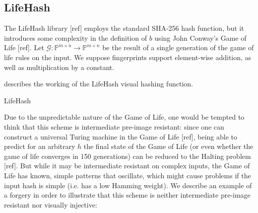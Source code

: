 \documentclass{article}
\newcommand{\bb}{\mathbb}
\newcommand{\prgb}{\bb P _\mathsf{RGB}}
\begin{document}
\subsection{LifeHash}
The LifeHash library [ref] employs the standard SHA-256 hash function, but it introduces some complexity in the definition of $b$ using John Conway's Game of Life [ref]. Let $\mathcal{G} : \mathbb P^{m \times n} \rightarrow \mathbb P ^{m \times n}$ be the result of a single generation of the game of life rules on the input. We suppose fingerprints support element-wise addition, as well as multiplication by a constant.

 describes the working of the LifeHash visual hashing function.

\begin{algorithm}
\DontPrintSemicolon
\SetAlgoNoEnd
{}
\KwResult{$F \in \prgb^{m_n}$}
\caption{LifeHash\label{algo:lifehash}}

\end{algorithm}


Due to the unpredictable nature of the Game of Life, one would be tempted to think that this scheme is intermediate pre-image resistant: since one can construct a universal Turing machine in the Game of Life [ref], being able to predict for an arbitrary $h$ the final state of the Game of Life (or even whether the game of life converges in 150 generations) can be reduced to the Halting problem [ref].
But while it may be intermediate resistant on complex inputs, the Game of Life has known, simple patterns that oscillate, which might cause problems if the input hash is simple (i.e. has a low Hamming weight). We describe an example of a forgery in order to illustrate that this scheme is neither intermediate pre-image resistant nor visually injective:
\end{document}
